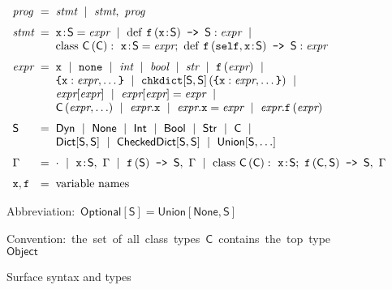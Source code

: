 \documentclass[english,cleveref,submission]{programming}
\makeatletter
\newcommand{\code}[1]{\texttt{#1}}
\newcommand{\defeq}{=}
\newcommand{\langmid}{~\mid~} %
\newenvironment{langarray}{\(\begin{array}{l@{\hspace{2mm}}c@{\hspace{2mm}}l}}{\end{array}\)}
\newcommand{\spapp}[2]{#1\,(#2)}
\newcommand{\spann}[2]{#1\!:\!#2}
\newcommand{\typefont}[1]{\mathsf{#1}}
\newcommand{\codefont}[1]{\emph{#1}}
\newcommand{\paramtype}[2]{#1[#2]}
\newcommand{\sptype}{\typefont{S}}
\newcommand{\sptclass}{\typefont{C}}
\newcommand{\sptint}{\typefont{Int}}
\newcommand{\sptstr}{\typefont{Str}}
\newcommand{\sptbool}{\typefont{Bool}}
\newcommand{\sptdyn}{\typefont{Dyn}}
\newcommand{\sptobject}{\typefont{Object}}
\newcommand{\sptnone}{\typefont{None}}
\newcommand{\sptoptional}[1]{\paramtype{\typefont{Optional}}{#1}}
\newcommand{\sptunion}[1]{\paramtype{\typefont{Union}}{#1}}
\newcommand{\sptrawpydict}{\typefont{Dict}}
\newcommand{\sptrawchkdict}{\typefont{CheckedDict}} %
\newcommand{\sptpydict}[2]{\paramtype{\sptrawpydict}{#1, #2}}
\newcommand{\sptchkdict}[2]{\paramtype{\sptrawchkdict}{#1, #2}}
\newcommand{\sptenv}{\Gamma} %
\newcommand{\sptenvnil}{\cdot}
\newcommand{\sptvardef}[2]{\spann{#1}{#2}}
\newcommand{\sptfundef}[3]{\spapp{#1}{#2}\code{ -> }#3}
\newcommand{\sptclassdef}[4]{\mathrm{class}~\spapp{#1}{#2}:~#3;~#4}
\newcommand{\spx}{\code{x}}
\newcommand{\spf}{\code{f}}
\newcommand{\spc}{\sptclass}
\newcommand{\spprog}{\codefont{prog}}
\newcommand{\spstmt}{\codefont{stmt}}
\newcommand{\spexpr}{\codefont{expr}}
\newcommand{\spvardef}[3]{\sptvardef{#1}{#2} = #3}
\newcommand{\spfundef}[4]{\mathrm{def}~\spapp{#1}{#2}\code{ -> }#3: #4}
\newcommand{\spclassdef}[4]{\mathrm{class}~\spapp{#1}{#2}:~#3;~#4}
\newcommand{\spself}{\code{self}}
\newcommand{\spnone}{\code{none}}
\newcommand{\spint}{\codefont{int}}
\newcommand{\spbool}{\codefont{bool}}
\newcommand{\spstr}{\codefont{str}}
\newcommand{\sppydict}[1]{\code{\{}#1\code{\}}}
\newcommand{\spchkdict}[3]{\spapp{\paramtype{\code{chkdict}}{#1, #2}}{#3}}
\newcommand{\spcnew}[2]{\spapp{#1}{#2}}
\newcommand{\spdictref}[2]{#1[#2]}
\newcommand{\spdictset}[3]{\spdictref{#1}{#2} = #3}
\newcommand{\spobjref}[2]{#1.#2}
\newcommand{\spobjset}[3]{\spobjref{#1}{#2} = #3}
\newcommand{\spobjapp}[3]{\spobjref{#1}{\spapp{#2}{#3}}}
\makeatother
\begin{document}
\begin{figure}[t]
  \begin{langarray}
    \spprog & \defeq &
      \spstmt \langmid \spstmt,~\spprog
    \\[1.5ex]
    \spstmt & \defeq &
      \spvardef{\spx}{\sptype}{\spexpr} \langmid
      \spfundef{\spf}{\spann{\spx}{\sptype}}{\sptype}{\spexpr} \langmid
  \\ & &
      \spclassdef{\spc}{\spc}{\spvardef{\spx}{\sptype}{\spexpr}}{\spfundef{\spf}{\spself, \spann{\spx}{\sptype}}{\sptype}{\spexpr}}
    \\[1.5ex]
    \spexpr & \defeq &
      \spx \langmid \spnone \langmid \spint \langmid \spbool \langmid \spstr \langmid
      \spapp{\spf}{\spexpr} \langmid
  \\ & &
      \sppydict{\spx: \spexpr, \ldots} \langmid
      \spchkdict{\sptype}{\sptype}{\sppydict{\spx: \spexpr, \ldots}} \langmid
  \\ & &
      \spdictref{\spexpr}{\spexpr} \langmid
      \spdictset{\spexpr}{\spexpr}{\spexpr} \langmid
  \\ & &
      \spcnew{\sptclass}{\spexpr, \ldots} \langmid
      \spobjref{\spexpr}{\spx} \langmid
      \spobjset{\spexpr}{\spx}{\spexpr} \langmid
      \spobjapp{\spexpr}{\spf}{\spexpr}
    \\[1.5ex]
    \sptype & \defeq &
      \sptdyn \langmid
      \sptnone \langmid
      \sptint \langmid
      \sptbool \langmid
      \sptstr \langmid
      \sptclass \langmid
  \\ & &
      \sptpydict{\sptype}{\sptype} \langmid
      \sptchkdict{\sptype}{\sptype} \langmid
      \sptunion{\sptype, \ldots}
    \\[1.5ex]
    \sptenv & \defeq &
      \sptenvnil \langmid
      \sptvardef{\spx}{\sptype},~\sptenv \langmid
      \sptfundef{\spf}{\sptype}{\sptype},~\sptenv \langmid
      \sptclassdef{\spc}{\spc}{\sptvardef{\spx}{\sptype}}{\sptfundef{\spf}{\sptclass, \sptype}{\sptype}},~\sptenv
    \\[1.5ex]
    \spx, \spf & \defeq & \mbox{variable names}
  \end{langarray}

  \bigskip
  \mbox{Abbreviation: $\sptoptional{\sptype} \defeq \sptunion{\sptnone, \sptype}$}

  \medskip
  \mbox{Convention: the set of all class types $\sptclass$ contains the top type $\sptobject$}

  \caption{Surface syntax and types}
  \label{f:surface-types}
\end{figure}
\end{document}
